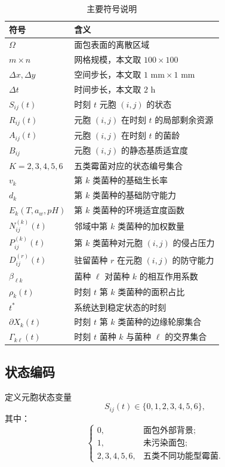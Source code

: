 \documentclass[12pt,a4paper]{ctexart}
\begin{document}
\begin{table}[H]
\centering
\caption{主要符号说明}
\begin{tabular}{p{2.6cm} p{9.2cm}}
\toprule
符号 & 含义 \\
\midrule
\(\Omega\) & 面包表面的离散区域 \\
\(m\times n\) & 网格规模，本文取 \(100\times 100\) \\
\(\Delta x,\Delta y\) & 空间步长，本文取 \(1\text{ mm}\times1\text{ mm}\) \\
\(\Delta t\) & 时间步长，本文取 \(2\) h \\
\(S_{ij}(t)\) & 时刻 \(t\) 元胞 \((i,j)\) 的状态 \\
\(R_{ij}(t)\) & 元胞 \((i,j)\) 在时刻 \(t\) 的局部剩余资源 \\
\(A_{ij}(t)\) & 元胞 \((i,j)\) 在时刻 \(t\) 的菌龄 \\
\(B_{ij}\) & 元胞 \((i,j)\) 的静态基质适宜度 \\
\(K={2,3,4,5,6}\) & 五类霉菌对应的状态编号集合 \\
\(v_k\) & 第 \(k\) 类菌种的基础生长率 \\
\(d_k\) & 第 \(k\) 类菌种的基础防守能力 \\
\(E_k(T,a_w,pH)\) & 第 \(k\) 类菌种的环境适宜度函数 \\
\(N_{ij}^{(k)}(t)\) & 邻域中第 \(k\) 类菌种的加权数量 \\
\(P_{ij}^{(k)}(t)\) & 第 \(k\) 类菌种对元胞 \((i,j)\) 的侵占压力 \\
\(D_{ij}^{(r)}(t)\) & 驻留菌种 \(r\) 在元胞 \((i,j)\) 的防守能力 \\
\(\beta_{\ell k}\) & 菌种 \(\ell\) 对菌种 \(k\) 的相互作用系数 \\
\(\rho_k(t)\) & 时刻 \(t\) 第 \(k\) 类菌种的面积占比 \\
\(t^\ast\) & 系统达到稳定状态的时刻 \\
\(\partial X_k(t)\) & 时刻 \(t\) 第 \(k\) 类菌种的边缘轮廓集合 \\
\(\Gamma_{k\ell}(t)\) & 时刻 \(t\) 菌种 \(k\) 与菌种 \(\ell\) 的交界集合 \\
\bottomrule
\end{tabular}
\end{table}

\subsection{状态编码}

定义元胞状态变量
\[
S_{ij}(t)\in\{0,1,2,3,4,5,6\},
\]
其中：
\[
\begin{cases}
0, & \text{面包外部背景};\\
1, & \text{未污染面包};\\
2,3,4,5,6, & \text{五类不同功能型霉菌}.
\end{cases}
\]
\end{document}
